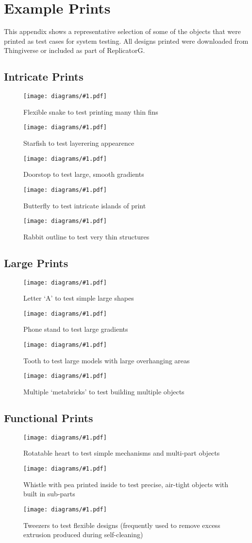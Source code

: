 \newcommand{\examplePrint}[2]{
	\begin{figure}[H]
		\texttt{[image: diagrams/\#1.pdf]}
		\caption{#2}
		\label{fig:#1}
	\end{figure}
}

\chapter{Example Prints}
	
	\label{sec:examplePrints}
	
	This appendix shows a representative selection of some of the objects that
	were printed as test cases for system testing. All designs printed were
	downloaded from Thingiverse or included as part of ReplicatorG.
	
	\section{Intricate Prints}
		
		\examplePrint{snake}{Flexible snake to test printing many thin fins}
		
		\examplePrint{starfish}{Starfish to test layerering appearence}
		
		\examplePrint{doorstop}{Doorstop to test large, smooth gradients}
		
		\examplePrint{butterfly}{Butterfly to test intricate islands of print}
		
		\examplePrint{rabbit}{Rabbit outline to test very thin structures}
		
	\section{Large Prints}
		
		\examplePrint{letter}{Letter `A' to test simple large shapes}
		
		\examplePrint{phoneDock}{Phone stand to test large gradients}
		
		\examplePrint{tooth}{Tooth to test large models with large overhanging areas}
		
		\examplePrint{joblot}{Multiple `metabricks' to test building multiple objects}
		
	\section{Functional Prints}
		
		\examplePrint{heart}{Rotatable heart to test simple mechanisms and
		                     multi-part objects}
		
		\examplePrint{whistle}{Whistle with pea printed inside to test precise,
		                       air-tight objects with built in sub-parts}
		
		\examplePrint{tweezers}{Tweezers to test flexible designs (frequently used
		                        to remove excess extrusion produced during
		                        self-cleaning)}
